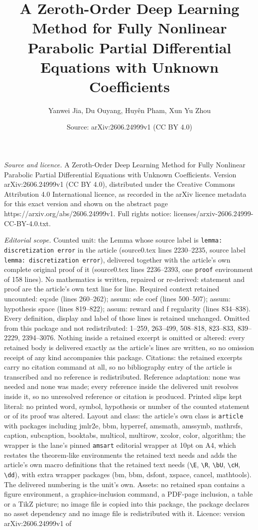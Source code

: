 \documentclass[10pt,a4paper]{amsart}
\title[A Zeroth-Order Deep Learning Method for Fully Nonlinear Para]{A Zeroth-Order Deep Learning Method for Fully Nonlinear Parabolic Partial Differential Equations with Unknown Coefficients}
\author{Yanwei Jia, Du Ouyang, Huy\^en Pham, Xun Yu Zhou}
\date{Source: arXiv:2606.24999v1 (CC BY 4.0)}
\begin{document}
\maketitle

\noindent\emph{Source and licence.} A Zeroth-Order Deep Learning Method for Fully Nonlinear Parabolic Partial Differential Equations with Unknown Coefficients. Version arXiv:2606.24999v1 (CC BY 4.0), distributed under the Creative Commons Attribution 4.0 International licence, as recorded in the arXiv licence metadata for this exact version and shown on the abstract page https://arxiv.org/abs/2606.24999v1. Full rights notice: licenses/arxiv-2606.24999-CC-BY-4.0.txt.\par\smallskip

\noindent\textit{Editorial scope.} Counted unit: the Lemma whose source label is \texttt{lemma: discretization error} in the article (source0.tex lines 2230--2235, source label \texttt{lemma: discretization error}), delivered together with the article's own complete original proof of it (source0.tex lines 2236--2393, one \texttt{proof} environment of 158 lines). No mathematics is written, repaired or re-derived: statement and proof are the article's own text line for line. Required context retained uncounted: eq:sde (lines 260--262); assum: sde coef (lines 500--507); assum: hypothesis space (lines 819--822); assum: reward and f regularity (lines 834--838). Every definition, display and label of those lines is retained unchanged. Omitted from this package and not redistributed: 1--259, 263--499, 508--818, 823--833, 839--2229, 2394--3076. Nothing inside a retained excerpt is omitted or altered: every retained body is delivered exactly as the article's lines are written, so no omission receipt of any kind accompanies this package. Citations: the retained excerpts carry no citation command at all, so no bibliography entry of the article is transcribed and no reference is redistributed. Reference adaptation: none was needed and none was made; every reference inside the delivered unit resolves inside it, so no unresolved reference or citation is produced. Printed slips kept literal: no printed word, symbol, hypothesis or number of the counted statement or of its proof was altered. Layout and class: the article's own class is \texttt{article} with packages including jmlr2e, bbm, hyperref, amsmath, amssymb, mathrsfs, caption, subcaption, booktabs, multicol, multirow, xcolor, color, algorithm; the wrapper is the lane's pinned \texttt{amsart} editorial wrapper at 10pt on A4, which restates the theorem-like environments the retained text needs and adds the article's own macro definitions that the retained text needs (\texttt{\textbackslash E}, \texttt{\textbackslash R}, \texttt{\textbackslash bU}, \texttt{\textbackslash cH}, \texttt{\textbackslash dd}), with extra wrapper packages (bm, bbm, dsfont, xspace, cancel, mathtools). The delivered numbering is the unit's own. Assets: no retained span contains a figure environment, a graphics-inclusion command, a PDF-page inclusion, a table or a TikZ picture; no image file is copied into this package, the package declares no asset dependency and no image file is redistributed with it. Licence: version arXiv:2606.24999v1 of 
\end{document}
